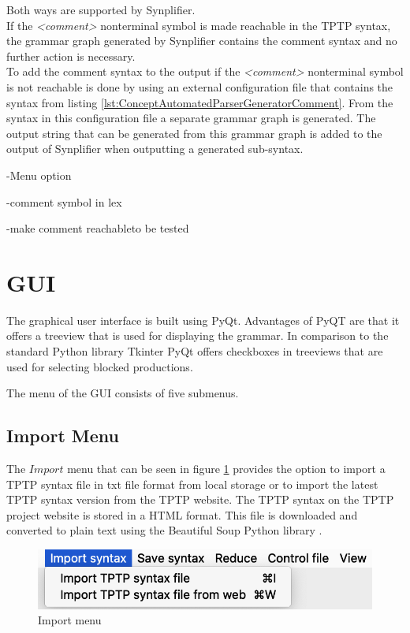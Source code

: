 Both ways are supported by \ac{Synplifier}.\\
If the \textit{<comment>} nonterminal symbol is made reachable in the \ac{TPTP} syntax, the grammar graph generated by \ac{Synplifier} contains the comment syntax and no further action is necessary.\\
To add the comment syntax to the output if the \textit{<comment>} nonterminal symbol is not reachable is done by using an external configuration file that contains the syntax from listing \ref{lst:ConceptAutomatedParserGeneratorComment}.
From the syntax in this configuration file a separate grammar graph is generated. The output string that can be generated from this grammar graph is added to the output of \ac{Synplifier} when outputting a generated sub-syntax.

-Menu option

-comment symbol in lex

-make comment reachableto be tested

\section{GUI}\label{sec:ConceptGUI}

The graphical user interface is built using PyQt. Advantages of PyQT are that it offers a treeview that is used for displaying the grammar. In comparison to the standard Python library Tkinter PyQt offers checkboxes in treeviews \cite{Tkinter} that are used for selecting blocked productions.

The menu of the GUI consists of five submenus.

\subsection{Import Menu}\label{sec:ConceptGUIImportMenu}

The $Import$ menu that can be seen in figure \ref{fig:import} provides the option to import a \ac{TPTP} syntax file in txt file format from local storage or to import the latest \ac{TPTP} syntax version from the \ac{TPTP} website.
The \ac{TPTP} syntax on the \ac{TPTP} project website is stored in a HTML format.
This file is downloaded and converted to plain text using the Beautiful Soup Python library \cite{BeautifulSoup}.

\begin{figure}[H]
\centering
\includegraphics[width=.7\textwidth]{images/import.png}
\caption{Import menu}
\label{fig:import}
\end{figure}

